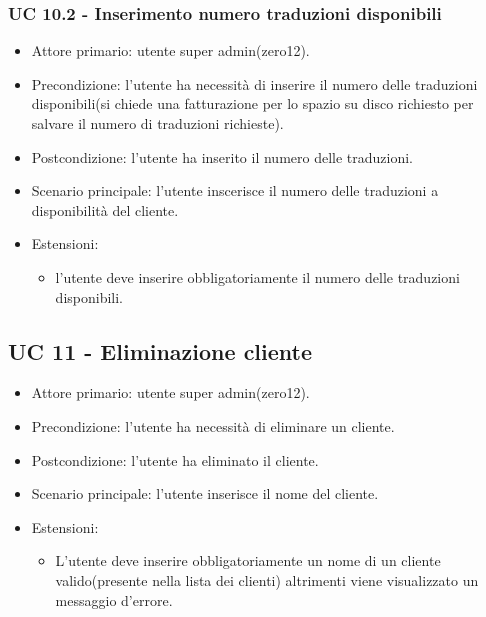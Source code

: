     \subsubsection{UC 10.2 - Inserimento numero traduzioni disponibili}
        \begin{itemize}
            \item Attore primario: utente super admin(zero12).
            \item Precondizione: l'utente ha necessità di inserire il numero delle traduzioni disponibili(si chiede una fatturazione per lo spazio su disco richiesto per salvare il numero di traduzioni richieste).
            \item Postcondizione: l'utente ha inserito il numero delle traduzioni.
            \item Scenario principale: l'utente inscerisce il numero delle traduzioni a disponibilità del cliente.
            \item Estensioni: 
                \begin{itemize}
                    \item l'utente deve inserire obbligatoriamente il numero delle traduzioni disponibili.
                \end{itemize}
        \end{itemize}
\subsection{UC 11 - Eliminazione cliente}
    \begin{itemize}
        \item Attore primario: utente super admin(zero12).
        \item Precondizione: l'utente ha necessità di eliminare un cliente.
        \item Postcondizione: l'utente ha eliminato il cliente.
        \item Scenario principale: l'utente inserisce il nome del cliente.
        \item Estensioni: 
        \begin{itemize}
            \item L'utente deve inserire obbligatoriamente un nome di un cliente valido(presente nella lista dei clienti) altrimenti viene visualizzato un messaggio d'errore.
        \end{itemize}
    \end{itemize}
